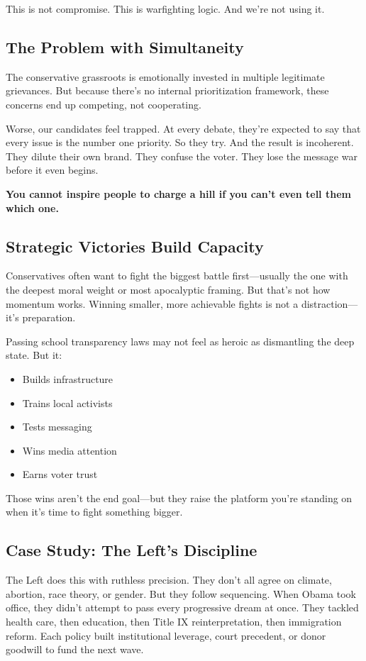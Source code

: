This is not compromise. This is warfighting logic. And we’re not using it.

\subsection*{The Problem with Simultaneity}

The conservative grassroots is emotionally invested in multiple legitimate grievances. But because there’s no internal prioritization framework, these concerns end up competing, not cooperating.

Worse, our candidates feel trapped. At every debate, they’re expected to say that every issue is the number one priority. So they try. And the result is incoherent. They dilute their own brand. They confuse the voter. They lose the message war before it even begins.

\textbf{You cannot inspire people to charge a hill if you can’t even tell them which one.}

\subsection*{Strategic Victories Build Capacity}

Conservatives often want to fight the biggest battle first—usually the one with the deepest moral weight or most apocalyptic framing. But that’s not how momentum works. Winning smaller, more achievable fights is not a distraction—it’s preparation.

Passing school transparency laws may not feel as heroic as dismantling the deep state. But it:
\begin{itemize}
    \item Builds infrastructure
    \item Trains local activists
    \item Tests messaging
    \item Wins media attention
    \item Earns voter trust
\end{itemize}

Those wins aren’t the end goal—but they raise the platform you’re standing on when it’s time to fight something bigger.

\subsection*{Case Study: The Left’s Discipline}

The Left does this with ruthless precision. They don’t all agree on climate, abortion, race theory, or gender. But they follow sequencing. When Obama took office, they didn’t attempt to pass every progressive dream at once. They tackled health care, then education, then Title IX reinterpretation, then immigration reform. Each policy built institutional leverage, court precedent, or donor goodwill to fund the next wave.

